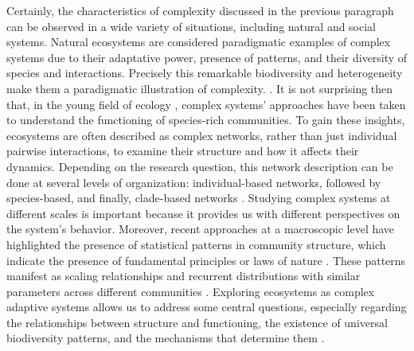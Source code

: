 Certainly, the characteristics of complexity discussed in the previous paragraph can be observed in a wide variety of situations, including natural and social systems. Natural ecosystems are considered paradigmatic examples of complex systems due to their adaptative power, presence of patterns, and their diversity of species and interactions. Precisely this remarkable biodiversity and heterogeneity make them a paradigmatic illustration of complexity. \cite{levin1998ecosystems}.  It is not surprising then that, in the young field of ecology \cite{ghazoul2020ecology}, complex systems' approaches have been taken to understand the functioning of species-rich communities. To gain these insights, ecosystems are often described as complex networks, rather than just individual pairwise interactions, to examine their structure and how it affects their dynamics. Depending on the research question, this network description can be done at several levels of organization: individual-based networks, followed by species-based, and finally, clade-based networks \cite{guimaraes2020structure}. Studying complex systems at different scales is important because it provides us with different perspectives on the system's behavior. Moreover, recent approaches at a macroscopic level have highlighted the presence of statistical patterns in community structure, which indicate the presence of fundamental principles or laws of nature \cite{brown1995macroecology,brown2004toward}. These patterns manifest as scaling relationships and recurrent distributions with similar parameters across different communities \cite{west1997general}. Exploring ecosystems as complex adaptive systems allows us to address some central questions, especially regarding the relationships between structure and functioning, the existence of universal biodiversity patterns, and the mechanisms that determine them \cite{levin1998ecosystems}.\\


